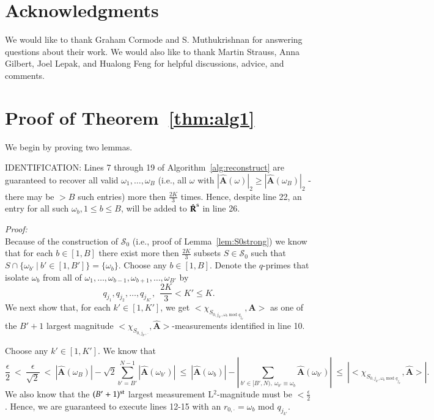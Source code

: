 \documentclass{article}
\begin{document}
\section{Acknowledgments}

We would like to thank Graham Cormode and S. Muthukrishnan for answering questions about their work.  We would also like to thank Martin Strauss, Anna Gilbert, Joel Lepak, and Hualong Feng for helpful discussions, advice, and comments.




\appendix

\section{Proof of Theorem~\ref{thm:alg1}}

We begin by proving two lemmas.

\begin{Lemma}
IDENTIFICATION:  Lines 7 through 19 of Algorithm~\ref{alg:reconstruct} are guaranteed to recover all valid $\omega_{1}, \dots, \omega_{B}$ (i.e., all $\omega$ with $| \hat{\textbf{A}}(\omega) |_{2} \geq | \hat{\textbf{A}}(\omega_{B}) |_{2}$ - there may be $> B$ such entries) more then $\frac{2K}{3}$ times.  Hence, despite line 22, an entry for all such $\omega_{b}, 1 \leq b \leq B$, will be added to $\hat{\textbf{R}}^{\rm s}$ in line 26.
\label{lem:identification}
\end{Lemma}

\noindent \textit{Proof:}\\

Because of the construction of $\mathcal{S}_{0}$ (i.e., proof of Lemma~\ref{lem:S0strong}) we know that for each $b \in [1,B]$ there exist more then $\frac{2K}{3}$ subsets $S \in \mathcal{S}_{0}$ such that $S \cap \{ \omega_{b'}~|~b' \in [1,B'] \} = \{ \omega_{b}\}$.  Choose any $b \in [1,B]$.  Denote the $q$-primes that isolate $\omega_{b}$ from all of $\omega_{1}, \dots, \omega_{b-1}, \omega_{b+1}, \dots, \omega_{B'}$ by
$$q_{j_{1}}, q_{j_{2}}, \dots, q_{j_{K'}},~~\frac{2K}{3} < K' \leq K.$$
We next show that, for each $k' \in [1,K']$, we get $<\chi_{S_{0,j_{k'},\omega_{b} \textrm{ mod } q_{j_{k'}}}},\textbf{A}>$ as one of the $B' + 1$ largest magnitude $<\chi_{S_{0,j_{k'},\cdot}},\hat{\textbf{A}}>$-measurements identified in line 10.

Choose any $k' \in [1,K']$.  We know that
$$\frac{\epsilon}{2}~<~\frac{\epsilon}{\sqrt{2}}~<~|\hat{\textbf{A}}(\omega_{B})| - \sqrt{2} \sum^{N-1}_{b'=B'} | \hat{\textbf{A}}(\omega_{b'}) |~\leq~|\hat{\textbf{A}}(\omega_{b})| - \left| \sum_{b' \in [B',N),~\omega_{b'} \equiv \omega_{b}} \hat{\textbf{A}}(\omega_{b'}) \right|~\leq~\left| <\chi_{S_{0,j_{k'},\omega_{b} \textrm{ mod } q_{j_{k'}}}},\hat{\textbf{A}}> \right|.$$
We also know that the $(B'+1)^{\rm st}$ largest measurement L$^{2}$-magnitude must be $< \frac{\epsilon}{2}$.  Hence, we are guaranteed to execute lines 12-15 with an $r_{0,\cdot} = \omega_{b}$ mod $q_{j_{k'}}$.
\end{document}
